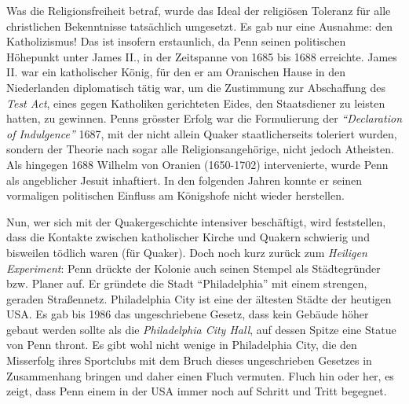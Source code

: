 \medskip

Was die Religionsfreiheit betraf, wurde das Ideal der religiösen Toleranz für
alle
christlichen Bekenntnisse tatsächlich umgesetzt. Es gab nur eine Ausnahme: den
Katholizismus! Das ist insofern erstaunlich, da Penn
seinen politischen Höhepunkt unter James II.,
 in der Zeitspanne von 1685 bis 1688 erreichte. James II. war ein
katholischer König, für den er am Oranischen Hause in
den Niederlanden
 diplomatisch tätig war, um die Zustimmung zur
Abschaffung des \textit{Test Act}, eines gegen Katholiken gerichteten Eides,
den Staatsdiener zu leisten hatten, zu gewinnen. Penns grösster
Erfolg war die Formulierung
der \textit{"`Declaration of Indulgence"'} 1687, mit der nicht allein Quaker
staatlicherseits toleriert wurden, sondern der Theorie nach sogar alle
Religionsangehörige, nicht jedoch Atheisten. Als
hingegen 1688 Wilhelm von Oranien (1650-1702) intervenierte, wurde Penn als angeblicher
Jesuit inhaftiert. In den folgenden Jahren konnte er
seinen vormaligen politischen Einfluss am Königshofe nicht
wieder herstellen.



\medskip

Nun, wer sich mit der Quakergeschichte intensiver beschäftigt, wird feststellen,
dass die Kontakte zwischen katholischer Kirche und Quakern schwierig und
bisweilen tödlich waren (für Quaker). Doch noch kurz zurück zum \textit{Heiligen
Experiment}: Penn drückte der Kolonie auch seinen Stempel als Städtegründer
bzw. Planer auf. Er gründete die Stadt "`Philadelphia"' mit einem strengen, geraden
Straßennetz. Philadelphia City ist eine der ältesten Städte der heutigen USA. Es gab
bis 1986 das ungeschriebene Gesetz, dass kein Gebäude höher gebaut werden sollte
als die \textit{Philadelphia City Hall},
auf dessen Spitze eine Statue von Penn thront. Es gibt wohl nicht wenige in
Philadelphia City, die den Misserfolg ihres Sportclubs
mit dem Bruch dieses ungeschrieben Gesetzes in Zusammenhang bringen und daher einen Fluch vermuten.
Fluch hin oder her, es zeigt, dass Penn einem in der USA immer noch auf
Schritt und Tritt
begegnet.


